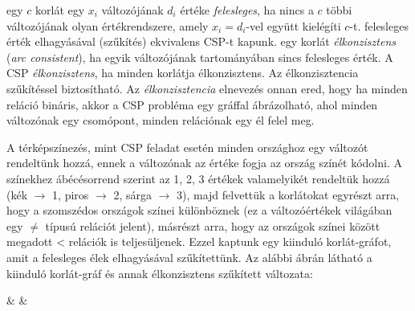  egy $c$ korlát egy $x_i$ változójának $d_i$ értéke
  \emph{felesleges}, ha nincs a $c$ többi változójának olyan értékrendszere,
  amely $x_i=d_i$-vel együtt kielégíti $c$-t.
\br
\tetel felesleges érték elhagyásával (szűkítés) ekvivalens CSP-t kapunk.
\br
{} egy korlát \emph{élkonzisztens} (\emph{arc consistent}),
  ha egyik változójának tartományában sincs felesleges érték. A CSP
  \emph{élkonzisztens}, ha minden korlátja élkonzisztens. Az élkonzisztencia
  szűkítéssel biztosítható.
\br
Az \emph{élkonzisztencia} elnevezés onnan ered, hogy ha minden reláció
bináris, akkor a CSP probléma egy gráffal ábrázolható, ahol minden változónak
egy csomópont, minden relációnak egy él felel meg.


A térképszínezés, mint CSP feladat esetén minden országhoz egy változót
rendeltünk hozzá, ennek a változónak az értéke fogja az ország színét
kódolni. A színekhez ábécésorrend szerint az 1, 2, 3 értékek valamelyikét
rendeltük hozzá (kék $\to$ 1, piros $\to$ 2, sárga $\to$ 3), majd felvettük a
korlátokat egyrészt arra, hogy a szomszédos országok színei különböznek (ez a
változóértékek világában egy $\neq$ típusú relációt jelent), másrészt arra, hogy
az országok színei között megadott < relációk is teljesüljenek. Ezzel
kaptunk egy kiinduló korlát-gráfot, amit a felesleges élek elhagyásával
szűkítettünk. Az alábbi ábrán látható a kiinduló korlát-gráf és annak
élkonzisztens szűkített változata:

 & &
\etab

